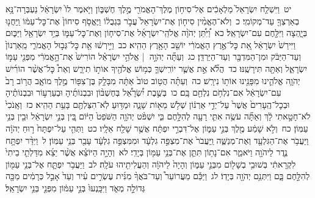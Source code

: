 \documentclass[18pt]{article}
\begin{document}
 {\loc יט~}וַיִּשְׁלַ֤ח יִשְׂרָאֵל֙ מַלְאָכִ֔ים אֶל־סִיח֥וֹן מֶלֶךְ־הָאֱמֹרִ֖י מֶ֣לֶךְ חֶשְׁבּ֑וֹן וַיֹּ֤אמֶר לוֹ֙ יִשְׂרָאֵ֔ל נַעְבְּרָה־נָּ֥א בְאַרְצְךָ֖ עַד־מְקוֹמִֽי׃ \startlock
 {\loc כ~}וְלֹא־הֶאֱמִ֨ין סִיח֤וֹן אֶת־יִשְׂרָאֵל֙ עֲבֹ֣ר בִּגְבֻל֔וֹ וַיֶּאֱסֹ֤ף סִיחוֹן֙ אֶת־כׇּל־עַמּ֔וֹ וַֽיַּחֲנ֖וּ בְּיָ֑הְצָה וַיִּלָּ֖חֶם עִם־יִשְׂרָאֵֽל׃ \startlock
 {\loc כא~}וַ֠יִּתֵּ֠ן יְהֹוָ֨ה אֱלֹהֵֽי־יִשְׂרָאֵ֜ל אֶת־סִיח֧וֹן וְאֶת־כׇּל־עַמּ֛וֹ בְּיַ֥ד יִשְׂרָאֵ֖ל וַיַּכּ֑וּם וַיִּירַשׁ֙ יִשְׂרָאֵ֔ל אֵ֚ת כׇּל־אֶ֣רֶץ הָאֱמֹרִ֔י יוֹשֵׁ֖ב הָאָ֥רֶץ הַהִֽיא׃ \startlock
 {\loc כב~}וַיִּ֣ירְשׁ֔וּ אֵ֖ת כׇּל־גְּב֣וּל הָאֱמֹרִ֑י מֵֽאַרְנוֹן֙ וְעַד־הַיַּבֹּ֔ק וּמִן־הַמִּדְבָּ֖ר וְעַד־הַיַּרְדֵּֽן׃ \startlock
 {\loc כג~}וְעַתָּ֞ה יְהֹוָ֣ה  |  אֱלֹהֵ֣י יִשְׂרָאֵ֗ל הוֹרִישׁ֙ אֶת־הָ֣אֱמֹרִ֔י מִפְּנֵ֖י עַמּ֣וֹ יִשְׂרָאֵ֑ל וְאַתָּ֖ה תִּירָשֶֽׁנּוּ׃ \startlock
 {\loc כד~}הֲלֹ֞א אֵ֣ת אֲשֶׁ֧ר יוֹרִֽישְׁךָ֛ כְּמ֥וֹשׁ אֱלֹהֶ֖יךָ אוֹת֣וֹ תִירָ֑שׁ וְאֵת֩ כׇּל־אֲשֶׁ֨ר הוֹרִ֜ישׁ יְהֹוָ֧ה אֱלֹהֵ֛ינוּ מִפָּנֵ֖ינוּ אוֹת֥וֹ נִירָֽשׁ׃ \startlock
 {\loc כה~}וְעַתָּ֗ה הֲט֥וֹב טוֹב֙ אַתָּ֔ה מִבָּלָ֥ק בֶּן־צִפּ֖וֹר מֶ֣לֶךְ מוֹאָ֑ב הֲר֥וֹב רָב֙ עִם־יִשְׂרָאֵ֔ל אִם־נִלְחֹ֥ם נִלְחַ֖ם בָּֽם׃ \startlock
 {\loc כו~}בְּשֶׁ֣בֶת יִ֠שְׂרָאֵ֠ל בְּחֶשְׁבּ֨וֹן וּבִבְנוֹתֶ֜יהָ וּבְעַרְע֣וֹר וּבִבְנוֹתֶ֗יהָ וּבְכׇל־הֶֽעָרִים֙ אֲשֶׁר֙ עַל־יְדֵ֣י אַרְנ֔וֹן שְׁלֹ֥שׁ מֵא֖וֹת שָׁנָ֑ה וּמַדּ֥וּעַ לֹֽא־הִצַּלְתֶּ֖ם בָּעֵ֥ת הַהִֽיא׃ \startlock
 {\loc כז~}וְאָֽנֹכִי֙ לֹא־חָטָ֣אתִי לָ֔ךְ וְאַתָּ֞ה עֹשֶׂ֥ה אִתִּ֛י רָעָ֖ה לְהִלָּ֣חֶם בִּ֑י יִשְׁפֹּ֨ט יְהֹוָ֤ה הַשֹּׁפֵט֙ הַיּ֔וֹם בֵּ֚ין בְּנֵ֣י יִשְׂרָאֵ֔ל וּבֵ֖ין בְּנֵ֥י עַמּֽוֹן׃ \startlock
 {\loc כח~}וְלֹ֣א שָׁמַ֔ע מֶ֖לֶךְ בְּנֵ֣י עַמּ֑וֹן אֶל־דִּבְרֵ֣י יִפְתָּ֔ח אֲשֶׁ֥ר שָׁלַ֖ח אֵלָֽיו׃ \startlock
 {\loc כט~}וַתְּהִ֤י עַל־יִפְתָּח֙ ר֣וּחַ יְהֹוָ֔ה וַיַּעֲבֹ֥ר אֶת־הַגִּלְעָ֖ד וְאֶת־מְנַשֶּׁ֑ה וַֽיַּעֲבֹר֙ אֶת־מִצְפֵּ֣ה גִלְעָ֔ד וּמִמִּצְפֵּ֣ה גִלְעָ֔ד עָבַ֖ר בְּנֵ֥י עַמּֽוֹן׃ \startlock
 {\loc ל~}וַיִּדַּ֨ר יִפְתָּ֥ח נֶ֛דֶר לַיהֹוָ֖ה וַיֹּאמַ֑ר אִם־נָת֥וֹן תִּתֵּ֛ן אֶת־בְּנֵ֥י עַמּ֖וֹן בְּיָדִֽי׃ \startlock
 {\loc לא~}וְהָיָ֣ה הַיּוֹצֵ֗א אֲשֶׁ֨ר יֵצֵ֜א מִדַּלְתֵ֤י בֵיתִי֙ לִקְרָאתִ֔י בְּשׁוּבִ֥י בְשָׁל֖וֹם מִבְּנֵ֣י עַמּ֑וֹן וְהָיָה֙ לַיהֹוָ֔ה וְהַעֲלִיתִ֖יהוּ עֹלָֽה׃ \startlock
 {\loc לב~}וַיַּעֲבֹ֥ר יִפְתָּ֛ח אֶל־בְּנֵ֥י עַמּ֖וֹן לְהִלָּ֣חֶם בָּ֑ם וַיִּתְּנֵ֥ם יְהֹוָ֖ה בְּיָדֽוֹ׃ \startlock
 {\loc לג~}וַיַּכֵּ֡ם מֵעֲרוֹעֵר֩ וְעַד־בֹּאֲךָ֨ מִנִּ֜ית עֶשְׂרִ֣ים עִ֗יר וְעַד֙ אָבֵ֣ל כְּרָמִ֔ים מַכָּ֖ה גְּדוֹלָ֣ה מְאֹ֑ד וַיִּכָּֽנְעוּ֙ בְּנֵ֣י עַמּ֔וֹן מִפְּנֵ֖י בְּנֵ֥י יִשְׂרָאֵֽל׃ \startlock
\end{document}
